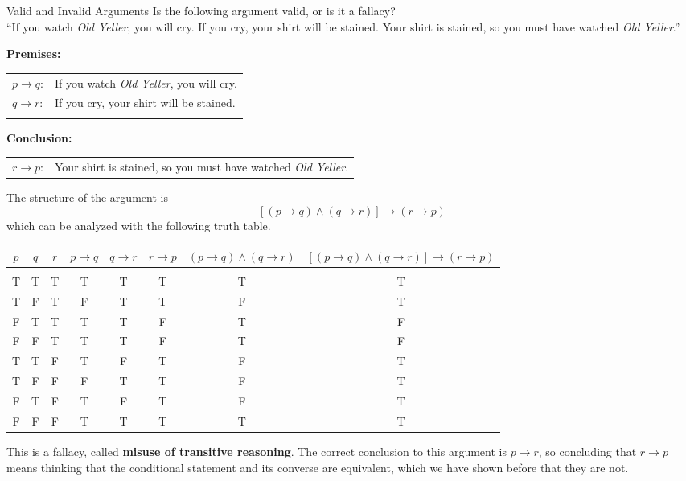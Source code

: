 \begin{example}[https://www.youtube.com/watch?v=ocJ0y5qimTY]{Valid and Invalid Arguments}
Is the following argument valid, or is it a fallacy?\\

``If you watch \textit{Old Yeller}, you will cry.  If you cry, your shirt will be stained.  Your shirt is stained, so you must have watched \textit{Old Yeller}.''

\sol
\textbf{Premises:}\\
\begin{tabular}{l l}
$p \to q$: & If you watch \textit{Old Yeller}, you will cry.\\
$q \to r$: & If you cry, your shirt will be stained.\\
& \\
\end{tabular}

\textbf{Conclusion:}\\
\begin{tabular}{l l}
$r \to p$: & Your shirt is stained, so you must have watched \textit{Old Yeller}.
\end{tabular}

The structure of the argument is \[[(p \to q) \wedge (q \to r)] \to (r \to p)\]
which can be analyzed with the following truth table.
\begin{center}
{\small
\begin{tabular}{|c c c c c c c c|}
\hline
$p$ & $q$ & $r$ & $p \to q$ & $q \to r$ & $r \to p$ & $(p \to q) \wedge (q \to r)$ & $[(p \to q) \wedge (q \to r)] \to (r \to p)$\\
\hline
& & & & & & & \\
T & T & T & T & T & T & T & T\\
T & F & T & F & T & T & F & T\\
F & T & T & T & T & F & T & F\\
F & F & T & T & T & F & T & F\\
T & T & F & T & F & T & F & T\\
T & F & F & F & T & T & F & T\\
F & T & F & T & F & T & F & T\\
F & F & F & T & T & T & T & T\\
\hline
\end{tabular}}
\end{center}

This is a fallacy, called \textbf{misuse of transitive reasoning}.  The correct conclusion to this argument is $p \to r$, so concluding that $r \to p$ means thinking that the conditional statement and its converse are equivalent, which we have shown before that they are not.
\end{example}

